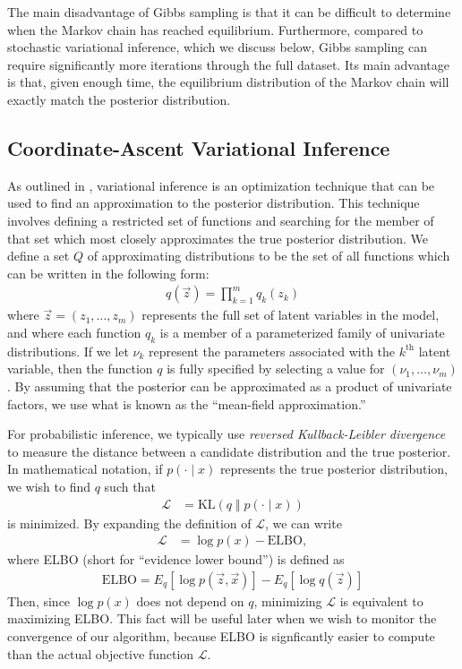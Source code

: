 \documentclass{article}
\newcommand{\nth}{^{\text{th}}}
\begin{document}
The main disadvantage of Gibbs sampling is that it can be difficult to determine when the Markov chain has reached equilibrium.
Furthermore, compared to stochastic variational inference, which we discuss below, Gibbs sampling can require significantly more iterations through the full dataset.
Its main advantage is that, given enough time, the equilibrium distribution of the Markov chain will exactly match the posterior distribution.

\subsection{Coordinate-Ascent Variational Inference}
\label{sec:cavi}

As outlined in \cite{blei2017variational}, variational inference is an optimization technique that can be used to find an approximation to the posterior distribution.
This technique involves defining a restricted set of functions and searching for the member of that set which most closely approximates the true posterior distribution.
We define a set $Q$ of approximating distributions to be the set of all functions which can be written in the following form:
\begin{align}
q(\vec z) = \prod_{k=1}^m q_k(z_k)
\end{align}
where $\vec z = (z_1, \ldots, z_m)$ represents the full set of latent variables in the model, and where each function $q_k$ is a member of a parameterized family of univariate distributions.
If we let $\nu_k$ represent the parameters associated with the $k\nth$ latent variable, then the function $q$ is fully specified by selecting a value for $(\nu_1, \ldots, \nu_m)$.
By assuming that the posterior can be approximated as a product of univariate factors, we use what is known as the ``mean-field approximation.''

For probabilistic inference, we typically use \emph{reversed Kullback-Leibler divergence} to measure the distance between a candidate distribution and the true posterior.
In mathematical notation, if $p(\cdot \mid x)$ represents the true posterior distribution, we wish to find $q$ such that
\begin{align}
\mathcal L &= \text{KL}( q \;\Vert\; p(\cdot \mid x) )
\end{align}
is minimized.
By expanding the definition of $\mathcal L$, we can write
\begin{align}
\mathcal L &= \log p(x) - \text{ELBO},
\end{align}
where ELBO (short for ``evidence lower bound'') is defined as
\begin{align}
\text{ELBO} = E_q[\log p(\vec z, \vec x)] - E_q[\log q(\vec z)]
\label{eq:elbo}
\end{align}
Then, since $\log p(x)$ does not depend on $q$, minimizing $\mathcal L$ is equivalent to maximizing ELBO.
This fact will be useful later when we wish to monitor the convergence of our algorithm, because ELBO is signficantly easier to compute than the actual objective function $\mathcal L$.
\end{document}
